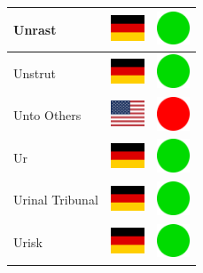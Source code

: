 \documentclass[12pt, a4paper, twoside]{report}
\begin{document}
\begin{center}
\begin{longtable}{|p{5cm}|p{2cm}|p{2cm}|}
 Unrast                                                     & \includegraphics[width=1cm]{../img/flags/de} &   \includegraphics[width=1cm]{../likes/y} \\ \hline
 Unstrut                                                    & \includegraphics[width=1cm]{../img/flags/de} &   \includegraphics[width=1cm]{../likes/y} \\ \hline
 Unto Others                                                & \includegraphics[width=1cm]{../img/flags/us} &   \includegraphics[width=1cm]{../likes/n} \\ \hline
 Ur                                                         & \includegraphics[width=1cm]{../img/flags/de} &   \includegraphics[width=1cm]{../likes/y} \\ \hline
 Urinal Tribunal                                            & \includegraphics[width=1cm]{../img/flags/de} &   \includegraphics[width=1cm]{../likes/y} \\ \hline
 Urisk                                                      & \includegraphics[width=1cm]{../img/flags/de} &   \includegraphics[width=1cm]{../likes/y} \\ \hline

\end{longtable}
\end{center}
\end{document}
